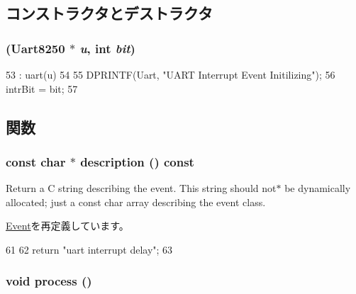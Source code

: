 \subsection{コンストラクタとデストラクタ}
\hypertarget{classUart8250_1_1IntrEvent_a9cb7bf0a580aa77d3175ccadf585457a}{
\subsubsection[{IntrEvent}]{ ({\bf Uart8250} $\ast$ {\em u}, \/  int {\em bit})}}
\label{classUart8250_1_1IntrEvent_a9cb7bf0a580aa77d3175ccadf585457a}



\begin{DoxyCode}
53     : uart(u)
54 {
55     DPRINTF(Uart, "UART Interrupt Event Initilizing\n");
56     intrBit = bit;
57 }
\end{DoxyCode}


\subsection{関数}
\hypertarget{classUart8250_1_1IntrEvent_a5a14fe478e2393ff51f02e9b7be27e00}{
\subsubsection[{description}]{\setlength{\rightskip}{0pt plus 5cm}const char $\ast$ description () const}}
\label{classUart8250_1_1IntrEvent_a5a14fe478e2393ff51f02e9b7be27e00}
Return a C string describing the event. This string should not$\ast$ be dynamically allocated; just a const char array describing the event class. 

\hyperlink{classEvent_a130ddddf003422b413e2e891b1b80e8f}{Event}を再定義しています。


\begin{DoxyCode}
61 {
62     return "uart interrupt delay";
63 }
\end{DoxyCode}
\hypertarget{classUart8250_1_1IntrEvent_a2e9c5136d19b1a95fc427e0852deab5c}{
\subsubsection[{process}]{\setlength{\rightskip}{0pt plus 5cm}void process ()}}
\label{classUart8250_1_1IntrEvent_a2e9c5136d19b1a95fc427e0852deab5c}


